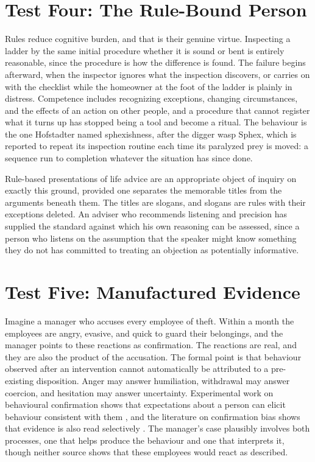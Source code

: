 \documentclass[12pt]{article}
\begin{document}
\section{Test Four: The Rule-Bound Person}\label{sec:t4}

Rules reduce cognitive burden, and that is their genuine virtue. Inspecting a ladder by the same initial procedure whether it is sound or bent is entirely reasonable, since the procedure is how the difference is found. The failure begins afterward, when the inspector ignores what the inspection discovers, or carries on with the checklist while the homeowner at the foot of the ladder is plainly in distress. Competence includes recognizing exceptions, changing circumstances, and the effects of an action on other people, and a procedure that cannot register what it turns up has stopped being a tool and become a ritual. The behaviour is the one Hofstadter named sphexishness, after the digger wasp Sphex, which is reported to repeat its inspection routine each time its paralyzed prey is moved: a sequence run to completion whatever the situation has since done.

Rule-based presentations of life advice are an appropriate object of inquiry on exactly this ground, provided one separates the memorable titles from the arguments beneath them. The titles are slogans, and slogans are rules with their exceptions deleted. An adviser who recommends listening and precision has supplied the standard against which his own reasoning can be assessed, since a person who listens on the assumption that the speaker might know something they do not has committed to treating an objection as potentially informative.

\section{Test Five: Manufactured Evidence}\label{sec:t5}

Imagine a manager who accuses every employee of theft. Within a month the employees are angry, evasive, and quick to guard their belongings, and the manager points to these reactions as confirmation. The reactions are real, and they are also the product of the accusation. The formal point is that behaviour observed after an intervention cannot automatically be attributed to a pre-existing disposition. Anger may answer humiliation, withdrawal may answer coercion, and hesitation may answer uncertainty. Experimental work on behavioural confirmation shows that expectations about a person can elicit behaviour consistent with them \cite{snyder1977}, and the literature on confirmation bias shows that evidence is also read selectively \cite{nickerson1998}. The manager's case plausibly involves both processes, one that helps produce the behaviour and one that interprets it, though neither source shows that these employees would react as described.
\end{document}
